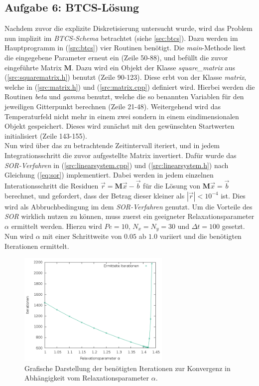 \documentclass[12pt,a4paper,titlepage,headinclude,bibtotoc]{scrartcl}
\begin{document}
\subsection{Aufgabe 6: BTCS-Lösung}
\label{sec:task6}
Nachdem zuvor die explizite Diskretisierung untersucht wurde, wird das Problem nun implizit im \textit{BTCS-Schema} betrachtet (siehe \ref{sec:btcs}). Dazu werden im Hauptprogramm in (\ref{src:btcs}) vier Routinen benötigt.
Die \textit{main}-Methode liest die eingegebene Parameter erneut ein (Zeile 50-88), und befüllt die zuvor eingeführte Matrix $\textbf{M}$. Dazu wird ein Objekt der Klasse \textit{square\_matrix} aus (\ref{src:squarematrix.h}) benutzt (Zeile 90-123). Diese erbt von der Klasse \textit{matrix}, welche in (\ref{src:matrix.h}) und (\ref{src:matrix.cpp}) definiert wird. Hierbei werden die Routinen \textit{beta} und \textit{gamma} benutzt, welche die so benannten Variablen für den jeweiligen Gitterpunkt berechnen (Zeile 21-48). Weitergehend wird das Temperaturfeld nicht mehr in einem zwei sondern in einem eindimensionalen Objekt gespeichert. Dieses wird zunächst mit den gewünschten Startwerten initialisiert (Zeile 143-155).\\
Nun wird über das zu betrachtende Zeitintervall iteriert, und in jedem Integrationsschritt die zuvor aufgestellte Matrix invertiert. Dafür wurde das \textit{SOR-Verfahren} in (\ref{src:linearsystem.cpp}) und (\ref{src:linearsystem.h}) nach Gleichung (\ref{eq:sor}) implementiert. Dabei werden in jedem einzelnen Interationsschritt die Residuen $\vec{r} = \textbf{M} \vec{x}-\vec{b}$ für die Lösung von $\textbf{M} \vec{x} = \vec{b}$ berechnet, und gefordert, dass der Betrag dieser kleiner als $|\vec{r}| < 10^{-4}$ ist. Dies wird als Abbruchbedingung im dem \textit{SOR-Verfahren} genutzt. Um die Vorteile des \textit{SOR} wirklich nutzen zu können, muss zuerst ein geeigneter Relaxationsparameter $\alpha$ ermittelt werden. Hierzu wird $Pe=10$, $N_x=N_y = 30$ und $\Delta t=100$ gesetzt. Nun wird $\alpha$ mit einer Schrittweite von $0.05$ ab $1.0$ variiert und die benötigten Iterationen ermittelt. 
\begin{figure}[H]
 \centering
   \includegraphics[width=0.65\textwidth]{res/task6/sor_parameter.png}
   \caption{Grafische Darstellung der benötigten Iterationen zur Konvergenz in Abhängigkeit vom Relaxationsparameter $\alpha$.}
 \label{fig:task6_param_comp}
\end{figure}
\end{document}
